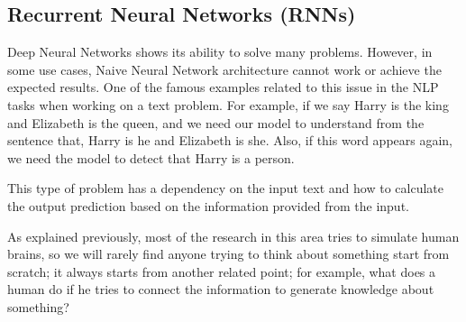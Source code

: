 \subsection{Recurrent Neural Networks (RNNs)}\label{Sec:RNN}

Deep Neural Networks shows its ability to solve many problems. However, in some use cases, Naive Neural Network architecture cannot work or achieve the expected results. One of the famous examples related to this issue in the NLP tasks when working on a text problem. For example, if we say Harry is the king and Elizabeth is the queen, and we need our model to understand from the sentence that, Harry is he and Elizabeth is she. Also, if this word appears again, we need the model to detect that Harry is a person.

This type of problem has a dependency on the input text and how to calculate the output prediction based on the information  provided from the input.

As explained previously, most of the research in this area tries to simulate human brains, so we will rarely find anyone trying to think about something start from scratch; it always starts from another related point; for example, what does a human do if he tries to connect the information to generate knowledge about something?

